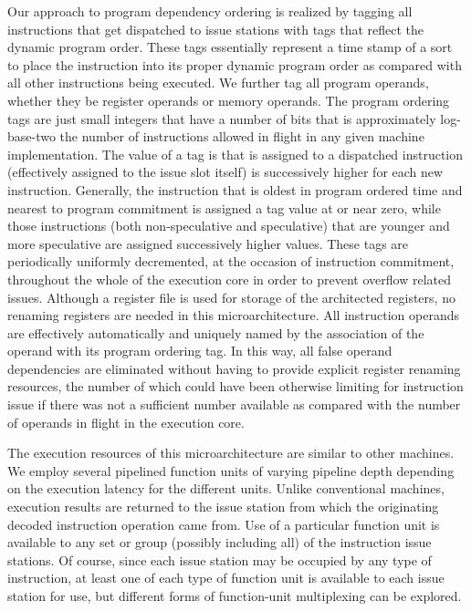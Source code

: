 \documentclass[10pt,twocolumn,dvips]{article}
\begin{document}
Our approach to program dependency ordering 
is realized by tagging all instructions that get
dispatched to issue stations with tags
that reflect the dynamic program order.  These tags essentially 
represent a
time stamp of a sort to place the instruction into its proper dynamic
program order as compared with all other instructions being executed.  
We further tag all program operands, whether
they be register operands or memory operands.
The program ordering tags are just small integers that 
have a number of bits that is
approximately log-base-two the number of instructions allowed in flight
in any given machine implementation.  The value of a tag is
that is assigned to a dispatched instruction 
(effectively assigned to the issue slot itself)
is successively higher for each new instruction.
Generally, the instruction that is oldest in program
ordered time and nearest to program commitment is assigned a tag
value at or near zero, while those instructions (both non-speculative
and speculative) that are younger and more speculative are assigned
successively higher values.  These tags are periodically uniformly
decremented, at the occasion of instruction commitment,
throughout the whole of the execution core in order to
prevent overflow related issues.  
Although a register file is used for storage of the architected
registers, no renaming registers are needed in this microarchitecture.
All instruction operands are effectively automatically and
uniquely named by the association of the operand with its program
ordering tag.  In this way, all false operand dependencies are
eliminated without having to provide explicit register renaming
resources, the number of which could have been otherwise limiting for
instruction issue if there was not
a sufficient number available as compared with the number of operands in
flight in the execution core.

The execution resources of this microarchitecture are similar
to other machines.  We employ several pipelined function units
of varying pipeline depth depending on the execution latency for
the different units.  Unlike conventional machines, execution results
are returned to the issue station from which the originating
decoded instruction operation came from.  
Use of a particular function unit is
available to any set or group (possibly including all) of the 
instruction issue stations.  Of course, since each issue station
may be occupied by any type of instruction, at least one of each
type of function unit is available to each issue station for use,
but different forms of function-unit multiplexing can be explored.
\end{document}
